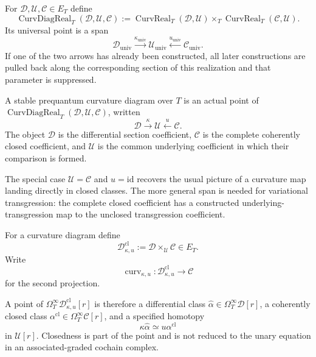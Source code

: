\begin{construction}
\label{constr:prequantum-curvature-diagram-realization}
For $\mathscr D,\mathscr U,\mathscr C\in E_T$ define
\[
\boxed{
\operatorname{CurvDiagReal}_T(\mathscr D,\mathscr U,\mathscr C)
:=
\operatorname{CurvReal}_T(\mathscr D,\mathscr U)
\times_T
\operatorname{CurvReal}_T(\mathscr C,\mathscr U).
}
\]
Its universal point is a span
\[
\mathscr D_{\mathrm{univ}}
\xrightarrow{\kappa_{\mathrm{univ}}}
\mathscr U_{\mathrm{univ}}
\xleftarrow{u_{\mathrm{univ}}}
\mathscr C_{\mathrm{univ}}.
\]
If one of the two arrows has already been constructed, all later constructions are
pulled back along the corresponding section of this realization and that parameter
is suppressed.
\end{construction}

\begin{definition}
\label{def:prequantum-stable-curvature-diagram}
A stable prequantum curvature diagram over $T$ is an actual point of
$\operatorname{CurvDiagReal}_T(\mathscr D,\mathscr U,\mathscr C)$, written
\[
\mathscr D\xrightarrow{\kappa}\mathscr U\xleftarrow{u}\mathscr C.
\]
The object $\mathscr D$ is the differential section coefficient,
$\mathscr C$ is the complete coherently closed coefficient, and $\mathscr U$ is
the common underlying coefficient in which their comparison is formed.
\end{definition}

The special case $\mathscr U=\mathscr C$ and $u=\mathrm{id}$ recovers the usual
picture of a curvature map landing directly in closed classes.  The more general
span is needed for variational transgression: the complete closed coefficient has
a constructed underlying-transgression map to the unclosed transgression
coefficient.

\begin{definition}
\label{def:prequantum-closed-differential-class-coefficient}
For a curvature diagram define
\[
\boxed{
\mathscr D^{\mathrm{cl}}_{\kappa,u}
:=
\mathscr D\times_{\mathscr U}\mathscr C
\in E_T.
}
\]
Write
\[
\operatorname{curv}_{\kappa,u}:
\mathscr D^{\mathrm{cl}}_{\kappa,u}
\longrightarrow
\mathscr C
\]
for the second projection.
\end{definition}

A point of $\Omega_T^\infty\mathscr D^{\mathrm{cl}}_{\kappa,u}[r]$ is therefore a
differential class $\widehat\alpha\in\Omega_T^\infty\mathscr D[r]$, a coherently
closed class $\alpha^{\mathrm{cl}}\in\Omega_T^\infty\mathscr C[r]$, and a
specified homotopy
\[
\kappa\widehat\alpha\simeq u\alpha^{\mathrm{cl}}
\]
in $\mathscr U[r]$.  Closedness is part of the point and is not reduced to the
unary equation in an associated-graded cochain complex.

